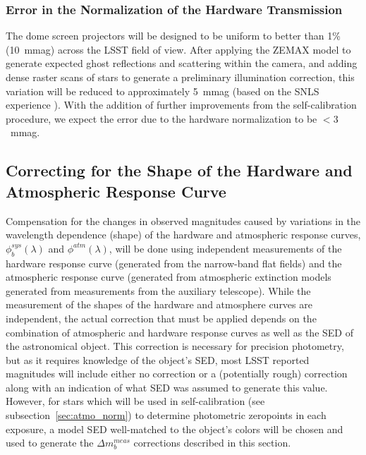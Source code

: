 \documentclass[12pt,preprint]{aastex}
\begin{document}
\subsubsection{Error in the Normalization of the Hardware Transmission}

The dome screen projectors will be designed to be uniform to better
than 1\% (10~mmag) across the LSST field of view. After
applying the ZEMAX model to generate expected ghost reflections and
scattering within the camera, and adding dense raster scans of stars to 
generate a preliminary illumination correction, this variation will be 
reduced to approximately 5~mmag (based on the SNLS experience \citep{Regnault2009}).
With the addition of further improvements from the self-calibration procedure,
we expect the error due to the hardware normalization to be $<3$~mmag. 


\subsection{Correcting for the Shape of the Hardware and Atmospheric
  Response Curve}
\label{sec:phi_correction}

Compensation for the changes in observed magnitudes caused by
variations in the wavelength dependence (shape) of the hardware and
atmospheric response curves, $\phi_b^{sys}(\lambda)$ and
$\phi^{atm}(\lambda)$, will be done using independent measurements of
the hardware response curve (generated from the narrow-band flat fields) and the
atmospheric response curve (generated from atmospheric extinction models
generated from measurements from the auxiliary telescope).  While the
measurement of the shapes of the hardware and atmosphere curves are
independent, the actual correction that must be applied depends on the
combination of atmospheric and hardware response curves as well as the
SED of the astronomical object.  This correction is necessary for
precision photometry, but as it requires knowledge of the object's
SED, most LSST reported magnitudes will include either no correction
or a (potentially rough) correction along with an indication of what
SED was assumed to generate this value. However, for stars which will
be used in self-calibration (see subsection~\ref{sec:atmo_norm}) to
determine photometric zeropoints in each exposure, a model SED
well-matched to the object's colors will be chosen and used to
generate the $\Delta m_b^{meas}$ corrections described in this
section.
\end{document}
